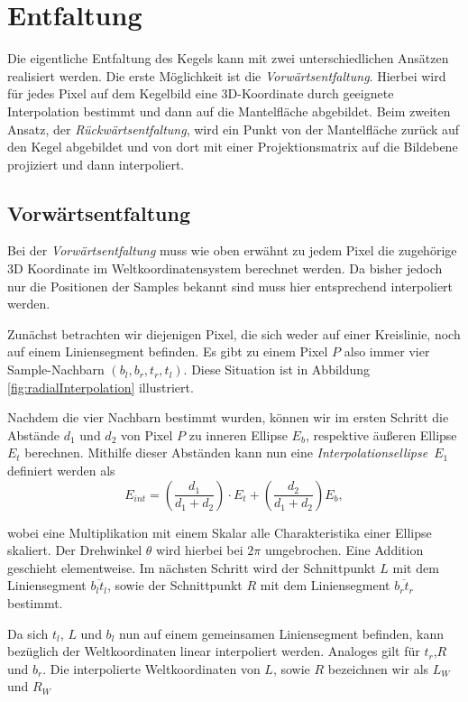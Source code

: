 \section{Entfaltung}
\label{s:unfolding}
Die eigentliche Entfaltung des Kegels kann mit zwei unterschiedlichen Ansätzen realisiert werden.
Die erste Möglichkeit ist die \textit{Vorwärtsentfaltung}. Hierbei wird für jedes Pixel auf dem Kegelbild eine 3D-Koordinate durch geeignete Interpolation bestimmt und dann auf die Mantelfläche abgebildet. Beim zweiten Ansatz, der \textit{Rückwärtsentfaltung}, wird ein Punkt von der Mantelfläche zurück auf den Kegel abgebildet und von dort mit einer Projektionsmatrix auf die Bildebene projiziert und dann interpoliert.

\subsection{Vorwärtsentfaltung}
Bei der \textit{Vorwärtsentfaltung} muss wie oben erwähnt zu jedem Pixel die zugehörige 3D Koordinate im Weltkoordinatensystem berechnet werden. Da bisher jedoch nur die Positionen der Samples bekannt sind muss hier entsprechend interpoliert werden.

Zunächst betrachten wir diejenigen Pixel, die sich weder auf einer Kreislinie, noch auf einem Liniensegment befinden. Es gibt zu einem Pixel $P$ also immer vier Sample-Nachbarn $(b_l, b_r, t_r, t_l)$. Diese Situation ist in Abbildung \ref{fig:radialInterpolation} illustriert.

Nachdem die vier Nachbarn bestimmt wurden, können wir im ersten Schritt die Abstände $d_1$ und $d_2$ von Pixel $P$ zu inneren Ellipse $E_b$, respektive äußeren Ellipse $E_t$ berechnen. Mithilfe dieser Abständen kann nun eine \textit{Interpolationsellipse}~$E_1$ definiert werden als
\begin{equation*}
	E_{int} = \left(\frac{d_1}{d_1 + d_2}\right) \cdot E_t + \left(\frac{d_2}{d_1 + d_2}\right) E_b,
\end{equation*}

wobei eine Multiplikation mit einem Skalar alle Charakteristika einer Ellipse skaliert. Der Drehwinkel $\theta$ wird hierbei bei $2\pi$ umgebrochen. Eine Addition geschieht elementweise. Im nächsten Schritt wird der Schnittpunkt $L$ mit dem Liniensegment $\overline{b_lt_l}$, sowie der Schnittpunkt $R$ mit dem Liniensegment $\overline{b_rt_r}$ bestimmt.

Da sich $t_l$, $L$ und $b_l$ nun auf einem gemeinsamen Liniensegment befinden, kann bezüglich der Weltkoordinaten linear interpoliert werden. Analoges gilt für $t_r$,$R$ und $b_r$.
Die interpolierte Weltkoordinaten von $L$, sowie $R$ bezeichnen wir als $L_W$ und $R_W$

